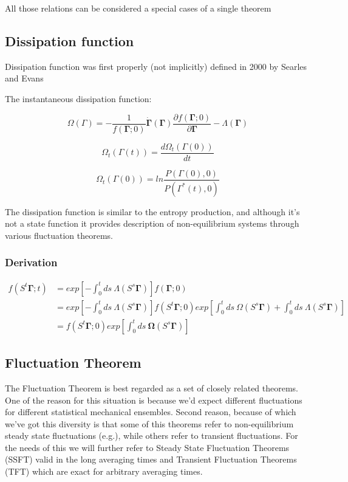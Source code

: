 \documentclass[a4paper,12pt,nofootinbib]{article}
\begin{document}
All those relations can be considered a special cases of a single theorem


\subsection{Dissipation function}

Dissipation function was first properly (not implicitly) defined in 2000 by Searles and Evans 

The instantaneous dissipation function:

\begin{equation}
  \Omega(\Gamma)=-\frac{1}{f(\bm{\Gamma};0)}\dot{\bm{\Gamma}}(\bm{\Gamma})\frac{\partial{f(\bm{\Gamma};0)}}{\partial{\bm{\Gamma}}}-\Lambda(\bm{\Gamma})
\end{equation}


\begin{displaymath}
  \Omega_t(\Gamma(t))=\frac{d \Omega_t(\Gamma(0))}{dt}
\end{displaymath}


\begin{displaymath}
  \Omega_t(\Gamma(0))=ln{\frac{P(\Gamma(0),0)}{P(\Gamma^*(t),0)}}
\end{displaymath}

The dissipation function is similar to the entropy production, and although it's not a state function it provides description of non-equilibrium systems through various fluctuation theorems.

\subsubsection{Derivation}


\begin{equation}
\begin{aligned}
  f(S^t\bm{\Gamma};t) &= exp[-\int_0^t ds\ \Lambda(S^s\bm{\Gamma})]f(\bm{\Gamma};0)\\
  &=exp[-\int_0^t ds\ \Lambda(S^s\bm{\Gamma})]f(S^t \bm{\Gamma};0) exp[\int_0^t ds\ \Omega(S^s \bm{\Gamma}) + \int_0^t ds\ \Lambda(S^s\bm{\Gamma})]\\
  &=f(S^t \bm{\Gamma};0) exp[\int_0^t ds\ \bm{\Omega}(S^s \bm{\Gamma})]
\end{aligned}
\end{equation}


\subsection{Fluctuation Theorem}
The Fluctuation Theorem is best regarded as a set of closely related theorems.
One of the reason for this situation is because we'd expect different fluctuations for different statistical mechanical ensembles.
Second reason, because of which we've got this diversity is that some of this theorems refer to non-equilibrium steady state fluctuations (e.g.), while others refer to transient fluctuations.
For the needs of this we will further refer to Steady State Fluctuation Theorems (SSFT) valid in the long averaging times and Transient Fluctuation Theorems (TFT) which are exact for arbitrary averaging times.
\end{document}
